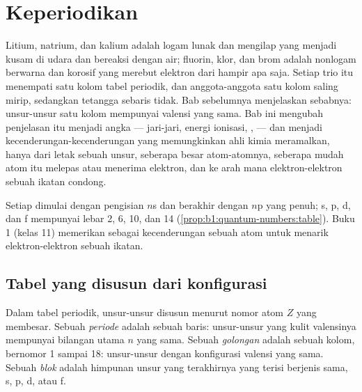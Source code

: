 \chapter{Keperiodikan}\label{ch:b1:periodicity}

Litium, natrium, dan kalium adalah logam lunak dan mengilap yang menjadi
kusam di udara dan bereaksi dengan air; fluorin, klor, dan brom adalah
nonlogam berwarna dan korosif yang merebut elektron dari hampir apa saja.
Setiap trio itu menempati satu kolom tabel periodik, dan anggota-anggota
satu kolom saling mirip, sedangkan tetangga sebaris tidak. Bab sebelumnya
menjelaskan sebabnya: unsur-unsur satu kolom mempunyai  valensi yang sama. Bab ini mengubah penjelasan itu menjadi
angka --- jari-jari, energi ionisasi, ,
 --- dan menjadi kecenderungan-kecenderungan yang
memungkinkan ahli kimia meramalkan, hanya dari letak sebuah unsur,
seberapa besar atom-atomnya, seberapa mudah atom itu melepas atau
menerima elektron, dan ke arah mana elektron-elektron sebuah ikatan
condong.

\begin{recall}
Setiap  dimulai dengan pengisian  $n$s dan berakhir dengan
 $n$p yang penuh;  s, p, d, dan f mempunyai lebar 2, 6, 10,
dan 14 (\cref{prop:b1:quantum-numbers:table}). Buku 1 (kelas 11)
memerikan  sebagai kecenderungan sebuah atom untuk
menarik elektron-elektron sebuah ikatan.
\end{recall}

\section{Tabel yang disusun dari konfigurasi}

\begin{definition}\label{def:b1:periodicity:table}
Dalam tabel periodik, unsur-unsur disusun menurut nomor atom $Z$ yang
membesar. Sebuah \emph{periode} adalah sebuah baris:
unsur-unsur yang kulit valensinya mempunyai bilangan utama $n$ yang sama.
Sebuah \emph{golongan} adalah sebuah kolom, bernomor 1
sampai 18: unsur-unsur dengan konfigurasi valensi yang sama. Sebuah
\emph{blok} adalah himpunan unsur yang  terakhirnya
yang terisi berjenis sama, s, p, d, atau f.
\end{definition}

